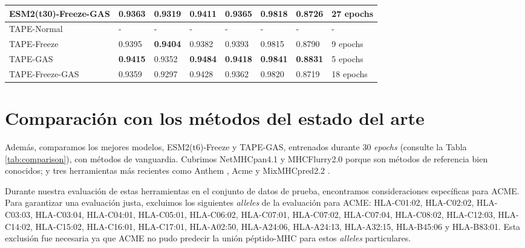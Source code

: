 \begin{table}[]
{\begin{tabular}{llllllll}
		ESM2(t30)-Freeze-GAS & 0.9363            & 0.9319             & 0.9411          & 0.9365            & \textbf{0.9818} & 0.8726          & 27 epochs           \\ \midrule
		TAPE-Normal                 & -                 & -                  & -               & -                 & -               & -               & -                   \\
		TAPE-Freeze          & 0.9395            & \textbf{0.9404}    & 0.9382          & 0.9393            & 0.9815          & 0.8790          & 9 epochs            \\
		TAPE-GAS             & \textbf{0.9415}   & 0.9352             & \textbf{0.9484} & \textbf{0.9418}   & \textbf{0.9841} & \textbf{0.8831} & 5 epochs            \\
		TAPE-Freeze-GAS      & 0.9359            & 0.9297             & 0.9428          & 0.9362            & 0.9820          & 0.8719          & 18 epochs      \\     
	\end{tabular}}
\end{table}

\section{Comparación con los métodos del estado del arte}

Además, comparamos los mejores modelos, ESM2(t6)-Freeze y TAPE-GAS, entrenados durante 30 \textit{epochs} (consulte la Tabla \ref{tab:comparison}), con métodos de vanguardia. Cubrimos NetMHCpan4.1 \citep{reynisson2020netmhcpan} y MHCFlurry2.0 \citep{o2020mhcflurry} porque son métodos de referencia bien conocidos; y tres herramientas más recientes como Anthem \citep{mei2021anthem}, Acme \citep{hu2019acme} y MixMHCpred2.2 \citep{gfeller2023improved}.

Durante nuestra evaluación de estas herramientas en el conjunto de datos de prueba, encontramos consideraciones específicas para ACME. Para garantizar una evaluación justa, excluimos los siguientes \textit{alleles} de la evaluación para ACME: HLA-C01:02, HLA-C02:02, HLA-C03:03, HLA-C03:04, HLA-C04:01, HLA-C05:01, HLA-C06:02, HLA-C07:01, HLA-C07:02, HLA-C07:04, HLA-C08:02, HLA-C12:03, HLA-C14:02, HLA-C15:02, HLA-C16:01, HLA-C17:01, HLA-A02:50, HLA-A24:06, HLA-A24:13, HLA-A32:15, HLA-B45:06 y HLA-B83:01. Esta exclusión fue necesaria ya que ACME no pudo predecir la unión péptido-MHC para estos \textit{alleles} particulares. 


